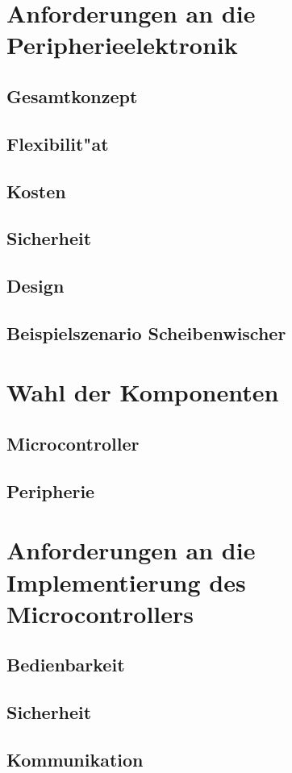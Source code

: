 \section{Anforderungen an die Peripherieelektronik}
\subsection{Gesamtkonzept}
\subsection{Flexibilit"at}
\subsection{Kosten}
\subsection{Sicherheit}
\subsection{Design}
\subsection{Beispielszenario Scheibenwischer}
\newpage
\section{Wahl der Komponenten}
\subsection{Microcontroller}
\subsection{Peripherie}
\newpage
\section{Anforderungen an die Implementierung des Microcontrollers}
\subsection{Bedienbarkeit}
\subsection{Sicherheit}
\subsection{Kommunikation}
